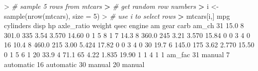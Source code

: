 \documentclass[
]{book}
\newenvironment{Shaded}{\begin{snugshade}}{\end{snugshade}}
\newcommand{\AttributeTok}[1]{\textcolor[rgb]{0.77,0.63,0.00}{#1}}
\newcommand{\CommentTok}[1]{\textcolor[rgb]{0.56,0.35,0.01}{\textit{#1}}}
\newcommand{\DecValTok}[1]{\textcolor[rgb]{0.00,0.00,0.81}{#1}}
\newcommand{\ErrorTok}[1]{\textcolor[rgb]{0.64,0.00,0.00}{\textbf{#1}}}
\newcommand{\FloatTok}[1]{\textcolor[rgb]{0.00,0.00,0.81}{#1}}
\newcommand{\FunctionTok}[1]{\textcolor[rgb]{0.00,0.00,0.00}{#1}}
\newcommand{\NormalTok}[1]{#1}
\newcommand{\OtherTok}[1]{\textcolor[rgb]{0.56,0.35,0.01}{#1}}
\newcommand{\SpecialCharTok}[1]{\textcolor[rgb]{0.00,0.00,0.00}{#1}}
\begin{document}
\begin{Shaded}
\begin{Highlighting}[]
\SpecialCharTok{\textgreater{}} \CommentTok{\# sample 5 rows from mtcars}
\ErrorTok{\textgreater{}} \CommentTok{\# get random row numbers}
\ErrorTok{\textgreater{}}\NormalTok{ i }\OtherTok{\textless{}{-}} \FunctionTok{sample}\NormalTok{(}\FunctionTok{nrow}\NormalTok{(mtcars), }\AttributeTok{size =} \DecValTok{5}\NormalTok{)}
\SpecialCharTok{\textgreater{}} \CommentTok{\# use i to select rows}
\ErrorTok{\textgreater{}}\NormalTok{ mtcars[i,]}
\NormalTok{    mpg cylinders  disp  hp axle\_ratio weight  qsec engine am gear carb am\_ch}
\DecValTok{31} \FloatTok{15.0}         \DecValTok{8} \FloatTok{301.0} \DecValTok{335}       \FloatTok{3.54}  \FloatTok{3.570} \FloatTok{14.60}      \DecValTok{0}  \DecValTok{1}    \DecValTok{5}    \DecValTok{8}     \DecValTok{1}
\DecValTok{7}  \FloatTok{14.3}         \DecValTok{8} \FloatTok{360.0} \DecValTok{245}       \FloatTok{3.21}  \FloatTok{3.570} \FloatTok{15.84}      \DecValTok{0}  \DecValTok{0}    \DecValTok{3}    \DecValTok{4}     \DecValTok{0}
\DecValTok{16} \FloatTok{10.4}         \DecValTok{8} \FloatTok{460.0} \DecValTok{215}       \FloatTok{3.00}  \FloatTok{5.424} \FloatTok{17.82}      \DecValTok{0}  \DecValTok{0}    \DecValTok{3}    \DecValTok{4}     \DecValTok{0}
\DecValTok{30} \FloatTok{19.7}         \DecValTok{6} \FloatTok{145.0} \DecValTok{175}       \FloatTok{3.62}  \FloatTok{2.770} \FloatTok{15.50}      \DecValTok{0}  \DecValTok{1}    \DecValTok{5}    \DecValTok{6}     \DecValTok{1}
\DecValTok{20} \FloatTok{33.9}         \DecValTok{4}  \FloatTok{71.1}  \DecValTok{65}       \FloatTok{4.22}  \FloatTok{1.835} \FloatTok{19.90}      \DecValTok{1}  \DecValTok{1}    \DecValTok{4}    \DecValTok{1}     \DecValTok{1}
\NormalTok{      am\_fac}
\DecValTok{31}\NormalTok{    manual}
\DecValTok{7}\NormalTok{  automatic}
\DecValTok{16}\NormalTok{ automatic}
\DecValTok{30}\NormalTok{    manual}
\DecValTok{20}\NormalTok{    manual}
\end{Highlighting}
\end{Shaded}
\end{document}
